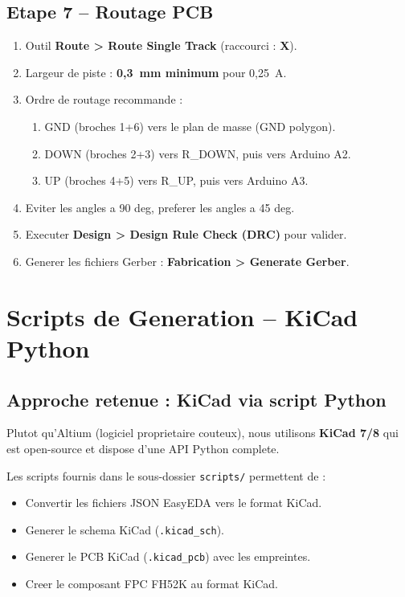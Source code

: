\documentclass[12pt,a4paper]{article}
\begin{document}
\subsection{Etape 7 -- Routage PCB}

\begin{enumerate}
  \item Outil \textbf{Route > Route Single Track} (raccourci : \textbf{X}).
  \item Largeur de piste : \textbf{0,3~mm minimum} pour 0,25~A.
  \item Ordre de routage recommande :
    \begin{enumerate}[label=\alph*.]
      \item GND (broches 1+6) vers le plan de masse (GND polygon).
      \item DOWN (broches 2+3) vers R\_DOWN, puis vers Arduino A2.
      \item UP (broches 4+5) vers R\_UP, puis vers Arduino A3.
    \end{enumerate}
  \item Eviter les angles a 90 deg, preferer les angles a 45 deg.
  \item Executer \textbf{Design > Design Rule Check (DRC)} pour valider.
  \item Generer les fichiers Gerber : \textbf{Fabrication > Generate Gerber}.
\end{enumerate}

\section{Scripts de Generation -- KiCad Python}

\subsection{Approche retenue : KiCad via script Python}

Plutot qu'Altium (logiciel proprietaire couteux), nous utilisons \textbf{KiCad 7/8}
qui est open-source et dispose d'une API Python complete.

Les scripts fournis dans le sous-dossier \texttt{scripts/} permettent de :

\begin{itemize}
  \item Convertir les fichiers JSON EasyEDA vers le format KiCad.
  \item Generer le schema KiCad (\texttt{.kicad\_sch}).
  \item Generer le PCB KiCad (\texttt{.kicad\_pcb}) avec les empreintes.
  \item Creer le composant FPC FH52K au format KiCad.
\end{itemize}
\end{document}
